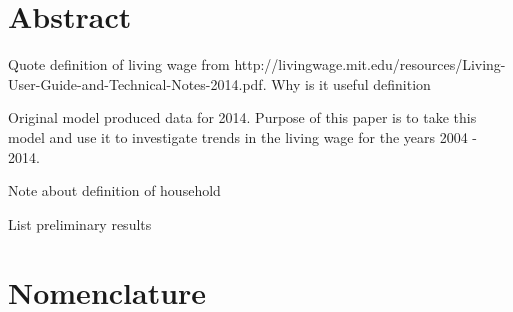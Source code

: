 \begingroup
\let\clearpage\relax
\let\cleardoublepage\relax
\let\cleardoublepage\relax

\chapter*{Abstract}

Quote definition of living wage from http://livingwage.mit.edu/resources/Living-User-Guide-and-Technical-Notes-2014.pdf. Why is it useful definition

Original model produced data for 2014. Purpose of this paper is to take this model and use it to investigate trends in the living wage for the years 2004 - 2014.

Note about definition of household

List preliminary results

\vfill
\clearpage
\chapter{Nomenclature}

